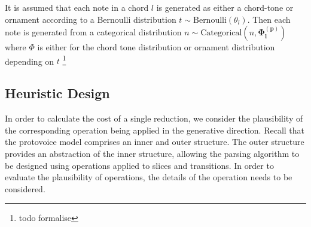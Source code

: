 \documentclass[12pt,a4paper,twoside,openright]{report} \usepackage[pdfborder={0 0 0}]{hyperref}    %
\theoremstyle{definition} \newtheorem{definition}{Definition}[section]
\begin{document}
  It is assumed that each note in a chord $l$ is generated as either a chord-tone or ornament according to a Bernoulli
  distribution $t \sim \text{Bernoulli}(\theta_l)$. Then each note is generated from a categorical distribution $n \sim
  \text{Categorical}(n,\bm{\Phi_l^{(p)}})$ where $\Phi$ is either for the chord tone distribution or ornament
  distribution depending on $t$ \footnote{todo formalise}

  \subsection{Heuristic Design}

  In order to calculate the cost of a single reduction, we consider the plausibility of the corresponding operation
  being applied in the generative direction. 
  Recall that the protovoice model comprises an inner and outer structure. The outer structure provides an abstraction
  of the inner structure, allowing the parsing algorithm to be designed using operations applied to slices and
  transitions. In order to evaluate the plausibility of operations, the details of the operation needs to be considered.
\end{document}
